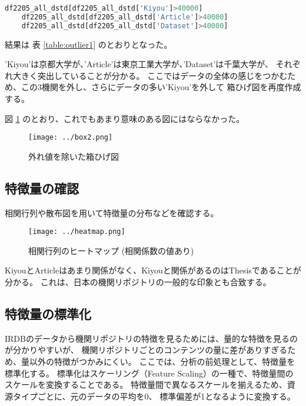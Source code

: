 \documentclass[submit,noauthor]{ono}
\begin{document}
\begin{lstlisting}[language=Python,breaklines]
	df2205_all_dstd[df2205_all_dstd['Kiyou']>40000]
	df2205_all_dstd[df2205_all_dstd['Article']>40000]
	df2205_all_dstd[df2205_all_dstd['Dataset']>40000]
\end{lstlisting}

結果は
表 \ref{table:outlier1}
のとおりとなった。

'Kiyou'は京都大学が、'Article'は東京工業大学が、'Dataset'は千葉大学が、
それぞれ大きく突出していることが分かる。
ここではデータの全体の感じをつかむため、この3機関を外し、さらにデータの多い'Kiyou'を外して
箱ひげ図を再度作成する。

図 \ref{fig:box2} のとおり、これでもあまり意味のある図にはならなかった。

\begin{figure}[h]
	\texttt{[image: ../box2.png]}
	\caption{外れ値を除いた箱ひげ図}
	\label{fig:box2}
\end{figure}

\subsection{特徴量の確認}

相関行列や散布図を用いて特徴量の分布などを確認する。

\begin{figure}[h]
	\texttt{[image: ../heatmap.png]}
	\caption{相関行列のヒートマップ (相関係数の値あり)}
	\label{fig:heatmap12}
\end{figure}

KiyouとArticleはあまり関係がなく、Kiyouと関係があるのはThesisであることが分かる。
これは、日本の機関リポジトリの一般的な印象とも合致する。

\subsection{特徴量の標準化}

IRDBのデータから機関リポジトリの特徴を見るためには、量的な特徴を見るのが分かりやすいが、
機関リポジトリごとのコンテンツの量に差がありすぎるため、量以外の特徴がつかみにくい。
ここでは、分析の前処理として、特徴量を標準化する。
標準化はスケーリング（Feature Scaling）の一種で、特徴量間のスケールを変換することである。
特徴量間で異なるスケールを揃えるため、資源タイプごとに、元のデータの平均を0、
標準偏差が1となるように変換する。
\end{document}
